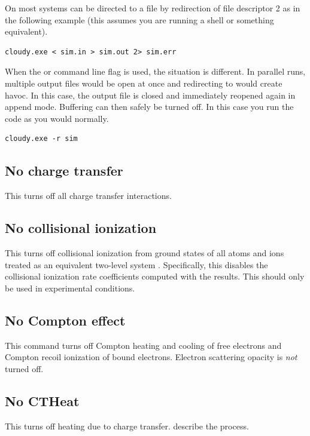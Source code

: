 On most systems  can be directed to a file by redirection of file descriptor 2 as in the following example
(this assumes you are running a  shell or something equivalent).
\begin{verbatim}
cloudy.exe < sim.in > sim.out 2> sim.err
\end{verbatim}
When the  or  command line flag is used, the
situation is different. In parallel runs, multiple output files would be open
at once and redirecting to  would create havoc. In this
case, the output file is closed and immediately reopened again in append mode.
Buffering can then safely be turned off. In this case you run the code as you
would normally.
\begin{verbatim}
cloudy.exe -r sim
\end{verbatim}

\subsection{No charge transfer}

This turns off all charge transfer interactions.

\subsection{No collisional ionization}

This turns off collisional ionization from ground states of all atoms
and ions treated as an equivalent two-level system \citep{CloudyRevista2017}.
Specifically, this disables the collisional ionization rate coefficients computed
with the \citet{Voronov1997} results.  
This should only be used in experimental conditions.

\subsection{No Compton effect}

This command turns off Compton heating and cooling of free electrons
and Compton recoil ionization of bound electrons.
Electron scattering opacity is \emph{not} turned off.

\subsection{No CTHeat}

This turns off heating due to charge transfer.
\citet{KingdonFerland1999} describe the process.

